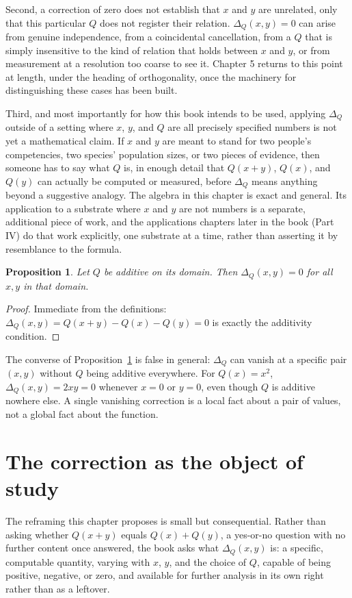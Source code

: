 \documentclass[11pt]{book}
\newtheorem{proposition}[theorem]{Proposition}
\begin{document}
Second, a correction of zero does not establish that $x$ and $y$ are unrelated, only that this particular $Q$ does not register their relation. $\Delta_Q(x,y)=0$ can arise from genuine independence, from a coincidental cancellation, from a $Q$ that is simply insensitive to the kind of relation that holds between $x$ and $y$, or from measurement at a resolution too coarse to see it. Chapter 5 returns to this point at length, under the heading of orthogonality, once the machinery for distinguishing these cases has been built.

Third, and most importantly for how this book intends to be used, applying $\Delta_Q$ outside of a setting where $x$, $y$, and $Q$ are all precisely specified numbers is not yet a mathematical claim. If $x$ and $y$ are meant to stand for two people's competencies, two species' population sizes, or two pieces of evidence, then someone has to say what $Q$ is, in enough detail that $Q(x+y)$, $Q(x)$, and $Q(y)$ can actually be computed or measured, before $\Delta_Q$ means anything beyond a suggestive analogy. The algebra in this chapter is exact and general. Its application to a substrate where $x$ and $y$ are not numbers is a separate, additional piece of work, and the applications chapters later in the book (Part IV) do that work explicitly, one substrate at a time, rather than asserting it by resemblance to the formula.

\begin{proposition}
\label{prop:vanishing}
Let $Q$ be additive on its domain. Then $\Delta_Q(x,y)=0$ for all $x,y$ in that domain.
\end{proposition}
\begin{proof}
Immediate from the definitions: $\Delta_Q(x,y)=Q(x+y)-Q(x)-Q(y)=0$ is exactly the additivity condition.
\end{proof}

The converse of Proposition~\ref{prop:vanishing} is false in general: $\Delta_Q$ can vanish at a specific pair $(x,y)$ without $Q$ being additive everywhere. For $Q(x)=x^2$, $\Delta_Q(x,y)=2xy=0$ whenever $x=0$ or $y=0$, even though $Q$ is additive nowhere else. A single vanishing correction is a local fact about a pair of values, not a global fact about the function.

\section{The correction as the object of study}

The reframing this chapter proposes is small but consequential. Rather than asking whether $Q(x+y)$ equals $Q(x)+Q(y)$, a yes-or-no question with no further content once answered, the book asks what $\Delta_Q(x,y)$ is: a specific, computable quantity, varying with $x$, $y$, and the choice of $Q$, capable of being positive, negative, or zero, and available for further analysis in its own right rather than as a leftover.
\end{document}
